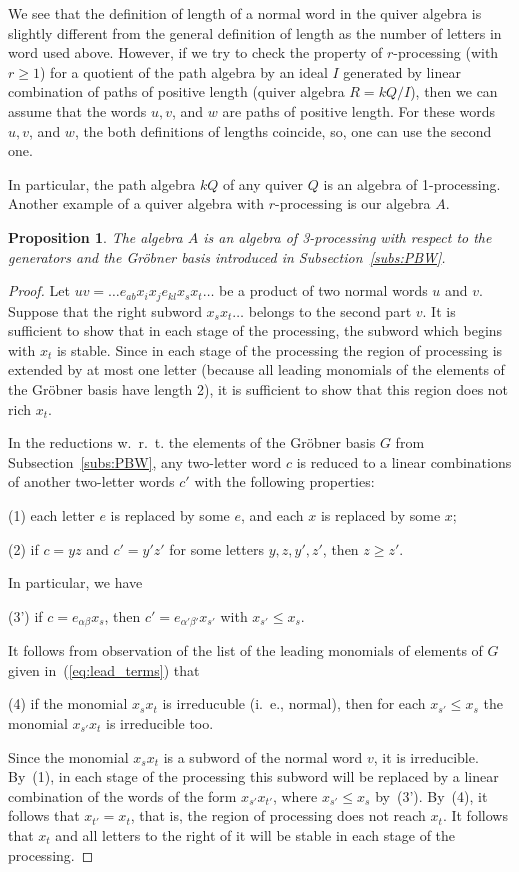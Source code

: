 \documentclass{amsart}
\numberwithin{equation}{section}
\theoremstyle{plain}
\newtheorem{prop}[theorem]{Proposition}
\theoremstyle{definition}
\begin{document}
 We see that the definition of length of a normal word in the quiver algebra 
 is slightly different from the general definition of length as the number of letters in word used above. 
However, if we try to check the property of $r$-processing (with $r\ge 1$) for a quotient of the path algebra by an ideal $I$ generated by linear combination of paths of positive length (quiver algebra $R = kQ /I$), then we can assume that the words $u,v$, and $w$ are paths of positive length. 
For these words $u,v$, and $w$, the both definitions of lengths coincide, so,
 one can use the second one. 
 
 In particular, 
the path algebra $kQ$ of any quiver $Q$ is an algebra of 1-processing. 
Another example of a quiver algebra with $r$-processing is our algebra $A$.
 

\begin{prop}
\label{prop:3-proc}
The algebra $A$ is an algebra of 3-processing with respect to the generators and the Gr\"obner basis introduced in Subsection~\ref{subs:PBW}. 
\end{prop}

\begin{proof}
Let $uv = \dots e_{ab}x_ix_je_{kl}x_sx_t\dots$ be a product of two normal words $u$ and $v$. Suppose that 
the right subword $x_sx_t\dots$ belongs to the second part $v$.
 It is sufficient to show that in 
each stage of the processing, the subword which begins with $x_t$ is stable. Since in each stage of the processing the region of processing is extended by at most one letter (because all leading monomials of the elements of the Gr\"obner basis have length 2), it is sufficient to show that this region does not rich $x_t$.

In the reductions w.~r.~t. the elements of the Gr\"obner basis $G$ from Subsection~\ref{subs:PBW}, any 
 two-letter word $c$ is reduced to a linear  combinations of another two-letter words $c'$ with the following properties:

(1)   each letter $e$ is replaced by some $e$, and each $x$ is replaced by some $x$;

(2) if $c = yz$ and $c' = y'z'$  for some letters $y,z,y',z'$, then $z\ge z'$.

In particular, we have 

(3') if $c= e_{\alpha \beta} x_{s}$, then $c'= e_{\alpha' \beta'} x_{s'}$ with $x_{s'} \le x_s$.

It follows from observation of  the list of the leading monomials of elements of $G$ given in~(\ref{eq:lead_terms})
that

(4) if the monomial $x_sx_t$ is irreducuble (i.~e., normal), then for each $x_{s'} \le x_s$ the monomial $x_{s'}x_t$ is irreducible too.

Since the monomial $x_sx_t$ is a subword of the normal word $v$, it is irreducible. 
 By~(1), in each stage of the processing this subword will be replaced by a linear combination of the words of the form $x_{s'}x_{t'}$, where $x_{s'} \le x_s$ by~(3'). By~(4), it follows that $x_{t'} = x_t$, that is,
 the region of processing does not reach $x_t$. It follows that $x_t$ and all letters to the right of it will be stable in each stage of the processing.   
\end{proof}
\end{document}
